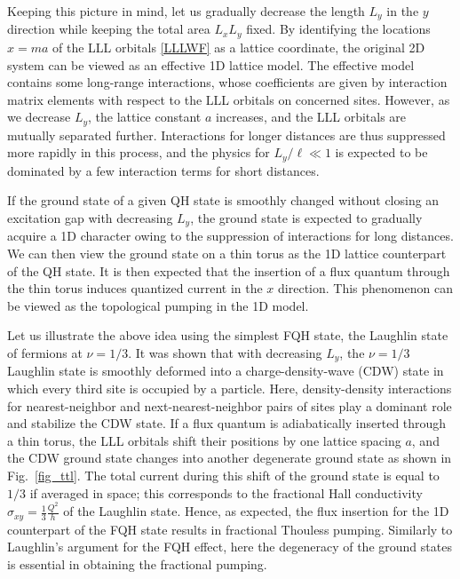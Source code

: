 \documentclass[aps,prb,twocolumn,superscriptaddress,showpacs,floatfix]{revtex4-1}
\begin{document}
Keeping this picture in mind, let us gradually decrease the length $L_y$ in the $y$ direction while keeping the total area $L_xL_y$ fixed. 
By identifying the locations $x=ma$ of the LLL orbitals \eqref{LLLWF} as a lattice coordinate, the original 2D system can be viewed as an effective 1D lattice model.\cite{TaoThouless, Seidel, Bergholtz1, Bergholtz2} The effective model contains some long-range interactions, whose coefficients are given by interaction matrix elements with respect to the LLL orbitals on concerned sites. 
However, as we decrease $L_y$, the lattice constant $a$ increases, and the LLL orbitals are mutually separated further. 
Interactions for longer distances are thus suppressed more rapidly in this process, and the physics for $L_y/\ell\ll 1$ is expected to be dominated by a few interaction terms for short distances. 

If the ground state of a given QH state is smoothly changed without closing an excitation gap with decreasing $L_y$, the ground state is expected to gradually acquire a 1D character owing to the suppression of interactions for long distances. We can then view the ground state on a thin torus as the 1D lattice counterpart of the QH state. It is then expected that the insertion of a flux quantum through the thin torus induces quantized current in the $x$ direction. This phenomenon can be viewed as the topological pumping in the 1D model.\cite{NiuThouless, NiuThoulessWu}

Let us illustrate the above idea using the simplest FQH state, the Laughlin state of fermions at $\nu=1/3$. It was shown that with decreasing $L_y$, the $\nu=1/3$ Laughlin state is smoothly deformed into a charge-density-wave (CDW) state in which every third site is occupied by a particle.\cite{Seidel} Here, density-density interactions for nearest-neighbor and next-nearest-neighbor 
pairs of sites play a dominant role and stabilize the CDW state. If a flux quantum is adiabatically inserted through a thin torus, 
the LLL orbitals shift their positions by one lattice spacing $a$, and the CDW ground state changes into another degenerate ground state\cite{NiuThoulessWu} as shown in Fig.\ \ref{fig_ttl}. 
The total current during this shift of the ground state is equal to $1/3$ if averaged in space; this corresponds to
the fractional Hall conductivity $\sigma_{xy}=\frac{1}{3}\frac{Q^2}{h}$ of the Laughlin state. Hence, as expected, the flux insertion for the 1D counterpart of the FQH state results in fractional Thouless pumping. Similarly to Laughlin's argument for the FQH effect,\cite{TaoWu} here the degeneracy of the ground states is essential in obtaining the fractional pumping. 
\end{document}
